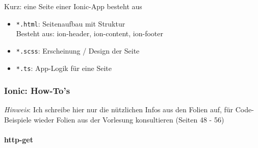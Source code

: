 \documentclass[a4paper]{article}
\begin{document}
		Kurz: eine Seite einer Ionic-App besteht aus
		\begin{itemize}
			\item \texttt{*.html}: Seitenaufbau mit Struktur\\
			Besteht aus: ion-header, ion-content, ion-footer
			\item \texttt{*.scss}: Erscheinung / Design der Seite
			\item \texttt{*.ts}: App-Logik für eine Seite
		\end{itemize}
	
		\newpage
	
		\subsubsection{Ionic: How-To's}
		
		\textit{Hinweis}: Ich schreibe hier nur die nützlichen Infos aus den Folien auf, für Code-Beispiele wieder Folien aus der Vorlesung konsultieren (Seiten 48 - 56)
		
		\paragraph{http-get}
		
\end{document}
